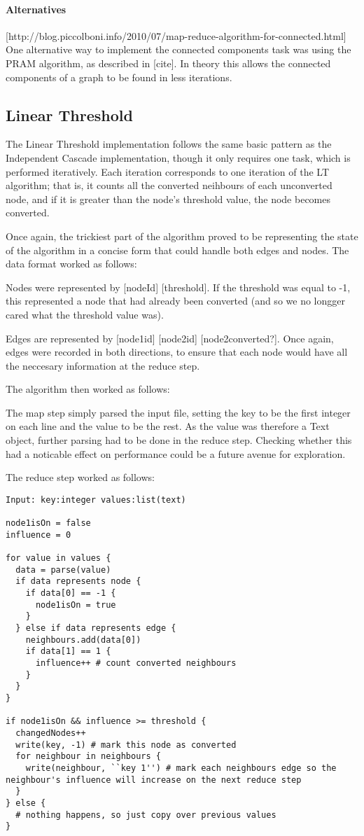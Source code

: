 \paragraph{Alternatives}

[http://blog.piccolboni.info/2010/07/map-reduce-algorithm-for-connected.html] One alternative way to implement the connected components task was using the PRAM algorithm, as described in [cite]. In theory this allows the connected components of a graph to be found in less iterations.

\subsection{Linear Threshold}

The Linear Threshold implementation follows the same basic pattern as the Independent Cascade implementation, though it only requires one task, which is performed iteratively. Each iteration corresponds to one iteration of the LT algorithm; that is, it counts all the converted neihbours of each unconverted node, and if it is greater than the node's threshold value, the node becomes converted.

Once again, the trickiest part of the algorithm proved to be representing the state of the algorithm in a concise form that could handle both edges and nodes. The data format worked as follows:

Nodes were represented by [nodeId] [threshold]. If the threshold was equal to -1, this represented a node that had already been converted (and so we no longger cared what the threshold value was).

Edges are represented by [node1id] [node2id] [node2converted?]. Once again, edges were recorded in both directions, to ensure that each node would have all the neccesary information at the reduce step.

The algorithm then worked as follows:

The map step simply parsed the input file, setting the key to be the first integer on each line and the value to be the rest. As the value was therefore a Text object, further parsing had to be done in the reduce step. Checking whether this had a noticable effect on performance could be a future avenue for exploration.

The reduce step worked as follows:

\begin{verbatim}
Input: key:integer values:list(text)

node1isOn = false
influence = 0

for value in values {
  data = parse(value)
  if data represents node {
    if data[0] == -1 {
      node1isOn = true
    }
  } else if data represents edge {
    neighbours.add(data[0])
    if data[1] == 1 {
      influence++ # count converted neighbours
    }
  }
}

if node1isOn && influence >= threshold {
  changedNodes++
  write(key, -1) # mark this node as converted
  for neighbour in neighbours {
    write(neighbour, ``key 1'') # mark each neighbours edge so the neighbour's influence will increase on the next reduce step
  }
} else {
  # nothing happens, so just copy over previous values
}
\end{verbatim}
